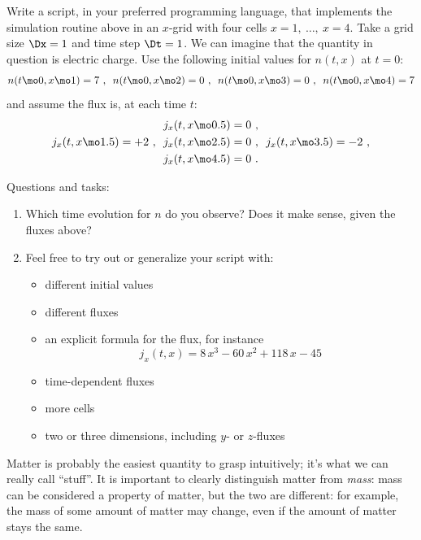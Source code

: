 \begin{exercise}
  Write a script, in your preferred programming language, that implements the simulation routine above in an $x$-grid with four cells $x=1,\ \dotsc,\ x=4$. Take a grid size $\Dx=1$ and time step $\Dt=1$. We can imagine that the quantity in question is electric charge. Use the following initial values for $n(t,x)$ at $t=0$:
  \begin{equation*}
    n(t\mo0, x\mo1)=7\ ,\enspace
    n(t\mo0, x\mo2)=0\ ,\enspace
    n(t\mo0, x\mo3)=0\ ,\enspace
    n(t\mo0, x\mo4)=7
  \end{equation*}
  and assume the flux is, at each time $t$:
  \begin{multline*}
      j_{x}(t, x\mo0.5)=0\ ,\\
      j_{x}(t, x\mo1.5)=+2\ ,\enspace
      j_{x}(t, x\mo2.5)=0\ ,\enspace
      j_{x}(t, x\mo3.5)=-2\ ,\\
      j_{x}(t, x\mo4.5)=0 \ .
    \end{multline*}

    Questions and tasks:
    \begin{enumerate}[exerc]
    \item Which time evolution for $n$ do you observe? Does it make sense, given the fluxes above?
    \item Feel free to try out or generalize your script with:
      \begin{itemize}[shift]
      \item different initial values
      \item different fluxes
      \item an explicit formula for the flux, for instance
        \begin{equation*}
          j_{x}(t,x) = 8\,x^{3} - 60\,x^{2} + 118\,x - 45
        \end{equation*}
      \item time-dependent fluxes
      \item more cells
      \item two or three dimensions, including $y$- or $z$-fluxes
      \end{itemize}
    \end{enumerate}

\end{exercise}



\printpagenotes*
\clearpage
{}
\label{ncha:matter}

Matter is probably the easiest quantity to grasp intuitively; it's what we can really call \enquote{stuff}. %
It is important to clearly distinguish matter from \emph{mass}: mass can be considered a property of matter, but the two are different: for example, the mass of some amount of matter may change, even if the amount of matter stays the same.

